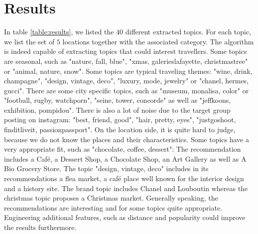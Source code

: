 \section{Results}
In table \ref{table:results}, we listed the $40$ different extracted topics. For each topic, we list the set of $5$ locations together with the associated category. The algorithm is indeed capable of extracting topics that could interest travellers. Some topics are seasonal, such as "nature, fall, blue", "xmas, galerieslafayette, christmastree" or "animal, nature, snow". Some topics are typical traveling themes: "wine, drink, champagne", "design, vintage, deco", "luxury, mode, jewelry" or "chanel, hermes, gucci". There are some city specific topics, such as "museum, monalisa, color" or "football, rugby, watchporn", "seine, tower, concorde" as well as "jeffkoons, exhibition, pompidou". There is also a lot of noise due to the target group posting on instagram: "best, friend, good", "hair, pretty, eyes", "justgoshoot, finditliveit, passionpassport". On the location side, it is quite hard to judge, because we do not know the places and their characteristics. Some topics have a very appropriate fit, such as "chocolate, coffee, dessert": The recommendation includes a Café, a Dessert Shop, a Chocolate Shop, an Art Gallery as well as A Bio Grocery Store. The topic "design, vintage, deco" includes in its recommendations a flea market, a café place well known for the interior design and a history site. The brand topic includes Chanel and Louboutin whereas the christmas topic proposes a Christmas market. Generally speaking, the recommendations are interesting and for some topics quite appropriate. Engineering additional features, such as distance and popularity could improve the results furthermore.

